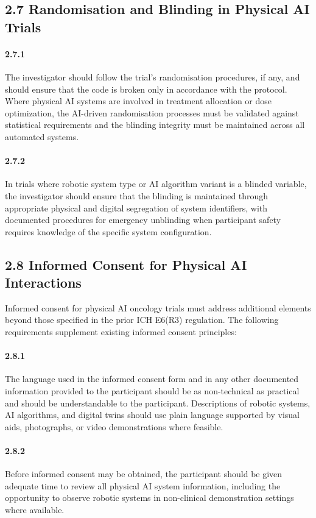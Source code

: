 \documentclass[11pt]{article}
\begin{document}
\subsection{2.7 Randomisation and Blinding in Physical AI Trials}

\paragraph{2.7.1} The investigator should follow the trial's randomisation procedures, if any, and should ensure that the code is broken only in accordance with the protocol. Where physical AI systems are involved in treatment allocation or dose optimization, the AI-driven randomisation processes must be validated against statistical requirements and the blinding integrity must be maintained across all automated systems.

\paragraph{2.7.2} In trials where robotic system type or AI algorithm variant is a blinded variable, the investigator should ensure that the blinding is maintained through appropriate physical and digital segregation of system identifiers, with documented procedures for emergency unblinding when participant safety requires knowledge of the specific system configuration.

\subsection{2.8 Informed Consent for Physical AI Interactions}

Informed consent for physical AI oncology trials must address additional elements beyond those specified in the prior ICH E6(R3) regulation. The following requirements supplement existing informed consent principles:

\paragraph{2.8.1} The language used in the informed consent form and in any other documented information provided to the participant should be as non-technical as practical and should be understandable to the participant. Descriptions of robotic systems, AI algorithms, and digital twins should use plain language supported by visual aids, photographs, or video demonstrations where feasible.

\paragraph{2.8.2} Before informed consent may be obtained, the participant should be given adequate time to review all physical AI system information, including the opportunity to observe robotic systems in non-clinical demonstration settings where available.
\end{document}
